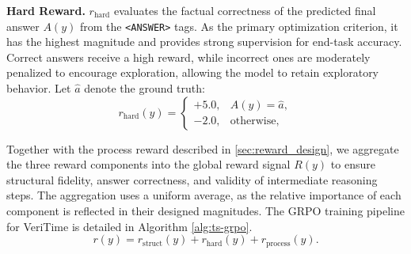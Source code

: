 \documentclass{article}
\theoremstyle{plain}
\theoremstyle{definition}
\theoremstyle{remark}
\begin{document}
\textbf{Hard Reward.} $r_{\text{hard}}$ evaluates the factual correctness of the predicted final answer $A(y)$ from the \texttt{<ANSWER>} tags. As the primary optimization criterion, it has the highest magnitude and provides strong supervision for end-task accuracy. Correct answers receive a high reward, while incorrect ones are moderately penalized to encourage exploration, allowing the model to retain exploratory behavior. Let $\hat{a}$ denote the ground truth:
\begin{equation}
r_{\text{hard}}(y) =
\begin{cases}
+5.0, & A(y) = \hat{a}, \\
-2.0, & \text{otherwise},
\end{cases}
\label{eq:hard_reward}
\end{equation}

Together with the process reward described in \autoref{sec:reward_design}, we aggregate the three reward components into the global reward signal \(R(y)\) to ensure structural fidelity, answer correctness, and validity of intermediate reasoning steps. The aggregation uses a uniform average, as the relative importance of each component is reflected in their designed magnitudes. The GRPO training pipeline for VeriTime is detailed in Algorithm \autoref{alg:ts-grpo}.
\begin{equation}
r(y) = r_{\text{struct}}(y) + r_{\text{hard}}(y) + r_{\text{process}}(y).
\end{equation}
\end{document}
